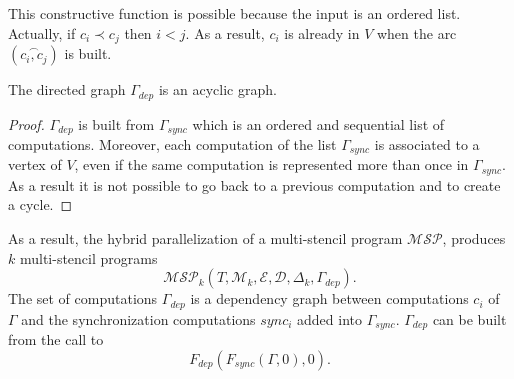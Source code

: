 This constructive function is possible because the input is an ordered list. Actually, if $c_i\prec c_j$ then $i<j$. As a result, $c_i$ is already in $V$ when the arc $(\overset{\frown}{c_i,c_j})$ is built. 

\begin{myprop}
The directed graph $\Gamma_{dep}$ is an acyclic graph.
\end{myprop}

\begin{proof}
$\Gamma_{dep}$ is built from $\Gamma_{sync}$ which is an ordered and sequential list of computations. Moreover, each computation of the list $\Gamma_{sync}$ is associated to a vertex of $V$, even if the same computation is represented more than once in $\Gamma_{sync}$. As a result it is not possible to go back to a previous computation and to create a cycle.
\end{proof}

As a result, the hybrid parallelization of a multi-stencil program $\mathcal{MSP}$, produces $k$ multi-stencil programs
\begin{equation*}
\mathcal{MSP}_k(T,\mathcal{M}_k,\mathcal{E},\mathcal{D},\Delta_k,\Gamma_{dep}).
\end{equation*}
The set of computations $\Gamma_{dep}$ is a dependency graph between computations $c_i$ of $\Gamma$ and the synchronization computations $sync_i$ added into $\Gamma_{sync}$. $\Gamma_{dep}$ can be built from the call to 
\begin{equation*}
F_{dep}(F_{sync}(\Gamma,0),0).
\end{equation*}


